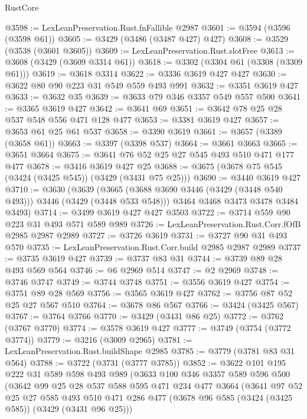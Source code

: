 \begin{lexlean}{RustCore}
\begin{coremodule}
@3598 := LexLeanPreservation.Rust.fnFallible @2987
@3601 := @3594 (@3596 (@3598 @61))
@3605 := @3429 (@3486 (@3487 @427) @427)
@3608 := @3529 (@3538 (@3601 @3605))
@3609 := LexLeanPreservation.Rust.slotFree
@3613 := @3608 (@3429 (@3609 @3314 @61))
@3618 := @3302 (@3304 @61 (@3308 (@3309 @61)))
@3619 := @3618 @3314
@3622 := @3336 @3619 @427 @427
@3630 := @3622 @80 @90 @223 @31 @549 @559 @493 @991
@3632 := @3351 @3619 @427
@3633 := @3632 @35
@3639 := @3633 @79 @346 @3357 @549 @557 @500
@3641 := @3365 @3619 @427
@3642 := @3641 @69
@3651 := @3642 @78 @25 @28 @537 @548 @556 @471 @128 @477
@3653 := @3381 @3619 @427
@3657 := @3653 @61 @25 @61 @537
@3658 := @3390 @3619
@3661 := @3657 (@3389 (@3658 @61))
@3663 := @3397 (@3398 @537)
@3664 := @3661 @3663
@3665 := @3651 @3664
@3675 := @3641 @76 @52 @25 @27 @545 @493 @510 @471 @177 @477
@3678 := @3416 @3619 @427 @25
@3688 := @3675 (@3678 @75 @545 (@3424 (@3425 @545)) (@3429 (@3431 @75 @25)))
@3690 := @3440 @3619 @427
@3710 := @3630
    (@3639
      (@3665 (@3688 @3690 @3446 (@3429 (@3448 @540 @493))) @3446 (@3429 (@3448 @533 @548)))
      @3464
      @3468
      @3473
      @3478
      @3484
      @3493)
@3714 := @3499 @3619 @427 @427 @3503
@3722 := @3714 @559 @90 @223 @31 @493 @571 @589 @989
@3726 := LexLeanPreservation.Rust.Corr.fOfB @2985 @2987 @2989
@3727 := @3726 @3619
@3731 := @3727 @90 @31 @493 @570
@3735 := LexLeanPreservation.Rust.Corr.build @2985 @2987 @2989
@3737 := @3735 @3619 @427
@3739 := @3737 @83 @31
@3744 := @3739 @89 @28 @493 @569 @564
@3746 := @6 @2969 @514
@3747 := @2 @2969
@3748 := @3746 @3747
@3749 := @3744 @3748
@3751 := @3556 @3619 @427
@3754 := @3751 @89 @28 @569
@3756 := @3565 @3619 @427
@3762 := @3756 @87 @52 @25 @27 @567 @510
@3764 := @3678 @86 @567
@3766 := @3424 (@3425 @567)
@3767 := @3764 @3766
@3770 := @3429 (@3431 @86 @25)
@3772 := @3762 (@3767 @3770)
@3774 := @3578 @3619 @427
@3777 := @3749 (@3754 (@3772 @3774))
@3779 := @3216 (@3009 @2965)
@3781 := LexLeanPreservation.Rust.buildShape @2985
@3785 := @3779 (@3781 @83 @31 @564)
@3788 := @3722 (@3731 (@3777 @3785))
@3852 := @3622
    @101
    @195
    @222
    @31
    @589
    @598
    @493
    @989
    (@3633
      @100
      @346
      @3357
      @589
      @596
      @500
      (@3642
        @99
        @25
        @28
        @537
        @588
        @595
        @471
        @234
        @477
        @3664
        (@3641
          @97
          @52
          @25
          @27
          @585
          @493
          @510
          @471
          @286
          @477
          (@3678 @96 @585 (@3424 (@3425 @585)) (@3429 (@3431 @96 @25)))

\end{coremodule}
\end{lexlean}
